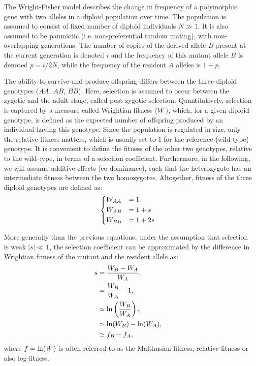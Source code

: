 The Wright-Fisher model describes the change in frequency of a polymorphic gene with two alleles in a diploid population over time.
The population is assumed to consist of fixed number of diploid individuals $N \gg 1$.
It is also assumed to be panmictic (i.e. non-preferential random mating), with non-overlapping generations.
The number of copies of the derived allele $B$ present at the current generation is denoted $i$ and the frequency of this mutant allele $B$ is denoted $p = i/2N$, while the frequency of the resident $A$ alleles is $1 - p$.

The ability to survive and produce offspring differs between the three diploid genotypes ($AA$, $AB$, $BB$).
Here, selection is assumed to occur between the zygotic and the adult stage, called post-zygotic selection.
Quantitatively, selection is captured by a measure called Wrightian fitness ($W$), which, for a given diploid genotype, is defined as the expected number of offspring produced by an individual having this genotype.
Since the population is regulated in size, only the relative fitness matters, which is usually set to $1$ for the reference (wild-type) genotype.
It is convenient to define the fitness of the other two genotypes, relative to the wild-type, in terms of a selection coefficient.
Furthermore, in the following, we will assume additive effects (co-dominance), such that the heterozygote has an intermediate fitness between the two homozygotes.
Altogether, fitness of the three diploid genotypes are defined as:
\begin{equation}
    \begin{dcases}
        W_{AA} & = 1 \\
        W_{AB} & = 1 + s \\
        W_{BB} & = 1 + 2s \\
    \end{dcases}
\end{equation}

More generally than the previous equations, under the assumption that selection is weak $|s| \ll 1$, the selection coefficient can be approximated by the difference in Wrightian fitness of the mutant and the resident allele as:
\begin{align}
    s & = \dfrac{W_{B} - W_{A}}{W_{A}}, \\
    & = \dfrac{W_{B}}{W_{A}} - 1, \\
    & \simeq \ln\left( \dfrac{W_{B}}{W_{A}} \right), \\
    & \simeq \ln(W_{B}) - \ln(W_{A}), \\
    & \simeq f_{B} - f_{A},
\end{align}
where $f = \ln(W)$ is often referred to as the Malthusian fitness, relative fitness or also log-fitness.

